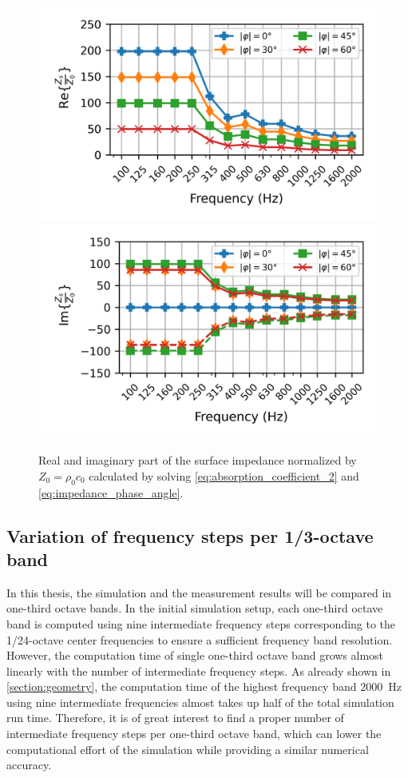 \begin{figure}[H]
	\centering
	\includegraphics{fig/chap4/impedance/impedance_real.png}
	\includegraphics{fig/chap4/impedance/impedance_imag.png}
	\caption{Real and imaginary part of the surface impedance normalized by $Z_0 = \rho_0 c_0$ calculated by solving \cref{eq:absorption_coefficient_2} and \cref{eq:impedance_phase_angle}.}
	\label{fig:input_impedance}
\end{figure}

\newpage
\subsection{Variation of frequency steps per 1/3-octave band}

In this thesis, the simulation and the measurement results will be compared in one-third octave bands.
In the initial simulation setup, each one-third octave band is computed using nine intermediate frequency steps corresponding to the 1/24-octave center frequencies to ensure a sufficient frequency band resolution.
However, the computation time of single one-third octave band grows almost linearly with the number of intermediate frequency steps.
As already shown in \cref{section:geometry}, the computation time of the highest frequency band \SI{2000}{Hz} using nine intermediate frequencies almost takes up half of the total simulation run time.
Therefore, it is of great interest to find a proper number of intermediate frequency steps per one-third octave band, which can lower the computational effort of the simulation while providing a similar numerical accuracy.

